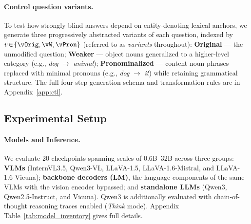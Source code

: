 \paragraph{Control question variants.}
\label{sec:control}
To test how strongly blind answers depend on entity-denoting lexical anchors,
we generate three progressively abstracted variants of each question,
indexed by $v\!\in\!\{\vOrig,\vW,\vPron\}$ (referred to as \emph{variants} throughout):
\textbf{Original} — the unmodified question;
\textbf{Weaker} — object nouns generalized to a higher-level category (e.g., \emph{dog} $\rightarrow$ \emph{animal});
\textbf{Pronominalized} — content noun phrases replaced with minimal pronouns (e.g., \emph{dog} $\rightarrow$ \emph{it}) while retaining grammatical structure.
The full four-step generation schema and transformation rules are in Appendix~\ref{app:ctl}.


\subsection{Experimental Setup}
\label{sec:exp_setup}

\paragraph{Models and Inference.}

We evaluate 20 checkpoints spanning scales of 0.6B--32B across three groups:
\textbf{VLMs} (InternVL3.5, Qwen3-VL, LLaVA-1.5, LLaVA-1.6-Mistral, and LLaVA-1.6-Vicuna);
\textbf{backbone decoders (LM)}, the language components of the same VLMs with the vision encoder bypassed; and
\textbf{standalone LLMs} (Qwen3, Qwen2.5-Instruct, and Vicuna).
Qwen3 is additionally evaluated with chain-of-thought reasoning traces enabled (\textit{Think} mode).
Appendix Table~\ref{tab:model_inventory} gives full details.

